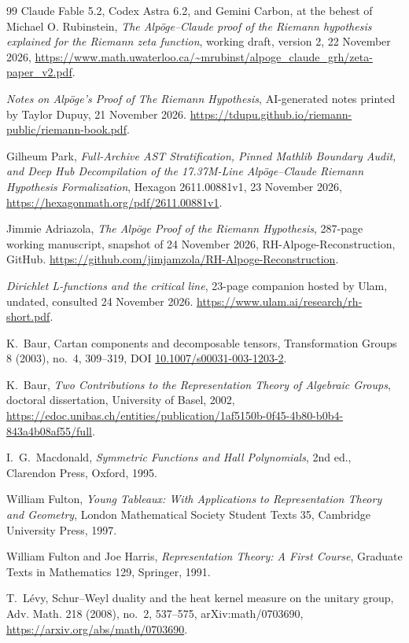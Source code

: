 \documentclass[11pt]{amsart}
\theoremstyle{definition}
\theoremstyle{remark}
\begin{document}
\begin{thebibliography}{99}
Claude Fable 5.2, Codex Astra 6.2, and Gemini Carbon, at the behest of
Michael O. Rubinstein, \emph{The Alp\"oge--Claude proof of the Riemann hypothesis
explained for the Riemann zeta function}, working draft, version 2,
22 November 2026,
\url{https://www.math.uwaterloo.ca/~mrubinst/alpoge_claude_grh/zeta-paper_v2.pdf}.

\emph{Notes on Alp\"oge's Proof of The Riemann Hypothesis}, AI-generated
notes printed by Taylor Dupuy, 21 November 2026.
\url{https://tdupu.github.io/riemann-public/riemann-book.pdf}.

Gilheum Park, \emph{Full-Archive AST Stratification, Pinned Mathlib Boundary Audit,
and Deep Hub Decompilation of the 17.37M-Line Alp\"oge--Claude Riemann
Hypothesis Formalization}, Hexagon 2611.00881v1, 23 November 2026,
\url{https://hexagonmath.org/pdf/2611.00881v1}.

Jimmie Adriazola, \emph{The Alp\"oge Proof of the Riemann Hypothesis},
287-page working manuscript, snapshot of 24 November 2026,
RH-Alpoge-Reconstruction, GitHub.
\url{https://github.com/jimjamzola/RH-Alpoge-Reconstruction}.

\emph{Dirichlet L-functions and the critical line}, 23-page companion
hosted by Ulam, undated, consulted 24 November 2026.
\url{https://www.ulam.ai/research/rh-short.pdf}.

K.~Baur, Cartan components and decomposable tensors,
Transformation Groups 8 (2003), no.~4, 309--319,
DOI \href{https://doi.org/10.1007/s00031-003-1203-2}{10.1007/s00031-003-1203-2}.

K.~Baur, \emph{Two Contributions to the Representation Theory of Algebraic
Groups}, doctoral dissertation, University of Basel, 2002,
\url{https://edoc.unibas.ch/entities/publication/1af5150b-0f45-4b80-b0b4-843a4b08af55/full}.

I.~G.~Macdonald, \emph{Symmetric Functions and Hall Polynomials}, 2nd ed.,
Clarendon Press, Oxford, 1995.

William Fulton, \emph{Young Tableaux: With Applications to Representation
Theory and Geometry}, London Mathematical Society Student Texts 35,
Cambridge University Press, 1997.

William Fulton and Joe Harris, \emph{Representation Theory: A First Course},
Graduate Texts in Mathematics 129, Springer, 1991.

T.~L\'evy, Schur--Weyl duality and the heat kernel measure on the unitary group,
Adv. Math. 218 (2008), no.~2, 537--575, arXiv:math/0703690,
\url{https://arxiv.org/abs/math/0703690}.


\end{thebibliography}
\end{document}
